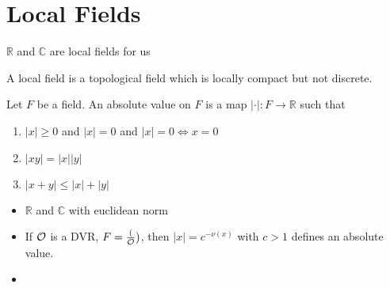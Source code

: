 \documentclass[../main.tex]{subfiles}
\begin{document}
\section{Local Fields}
\begin{example}
$\mathbb{R}$ and $\mathbb{C}$ are local fields for us
\end{example}
\begin{defn}
	A local field is a topological field which is locally compact but not discrete.
\end{defn}
\begin{defn}
Let $F$ be a field. An absolute value on $F$ is a map $|\cdot|: F \to \mathbb{R}$ such that
\begin{enumerate}
\item $|x| \geq 0$ and $|x|=0$ and $|x| = 0 \iff x=0$ 
\item $|xy| = |x||y|$ 
\item $|x+y| \leq |x| + |y|$ 
\end{enumerate}
\end{defn}
\begin{exemple}
	\begin{itemize}
	\item $ \mathbb{R}$ and $\mathbb{C}$ with euclidean norm
	\item If $\mathcal{O}$ is a DVR, $F = \frac( {\mathcal{O}}) $, then $|x| = c^{-\nu( x) }$ with $c>1$ defines an absolute value.
	\item 
	\end{itemize}
	
\end{exemple}
\end{document}
